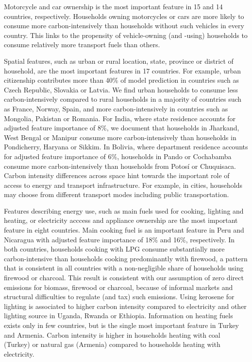 \documentclass[12pt, a4paper]{article}
\begin{document}
Motorcycle and car ownership is the most important feature in 15 and 14 countries, respectively. Households owning motorcycles or cars are more likely to consume more carbon-intensively than households without such vehicles in every country. This links to the propensity of vehicle-owning (and -using) households to consume relatively more transport fuels than others.

Spatial features, such as urban or rural location, state, province or district of household, are the most important features in 17 countries. For example, urban citizenship contributes more than 40\% of model prediction in countries such as Czech Republic, Slovakia or Latvia. We find urban households to consume less carbon-intensively compared to rural households in a majority of countries such as France, Norway, Spain, and more carbon-intensively in countries such as Mongolia, Pakistan or Romania. For India, where state residence accounts for adjusted feature importance of 8\%, we document that households in Jharkand, West Bengal or Manipur consume more carbon-intensively than households in Pondicherry, Haryana or Sikkim. In Bolivia, where department residence accounts for adjusted feature importance of 6\%, households in Pando or Cochabamba consume more carbon-intensively than households from Potosí or Chuquisaca. Carbon intensity differences across space hint towards the important role of access to energy and transport infrastructure. For example, in cities, households may choose from different transport modes including public transportation.

Features describing energy use, such as main fuels used for cooking, lighting and heating, or electricity acccess and appliance ownership are the most important feature in eight countries. Main cooking fuel is an important feature in Peru and Nicaragua with adjusted feature importance of 18\% and 16\%, respectively. In both countries, households cooking with LPG consume substantially more carbon-intensive than households cooking predominantly with firewood, a pattern that is consistent in all countries with a non-negligible share of households using firewood or charcoal. This result is consistent with our assumption of zero direct emissions for biomass, firewood or charcoal, because of informal markets and structural difficulties to regulate (and tax) such emissions. Using kerosene for lighting is associated to higher carbon intensity compared to electricity and other lighting source in Uganda, Rwanda or Ethiopia. Information on heating fuels exists only in few countries, but is the single most important feature in Turkey and Armenia. Carbon intensity is higher in households heating with coal (Turkey) or natural gas (Armenia) compared to households heating with electricity.
\end{document}
